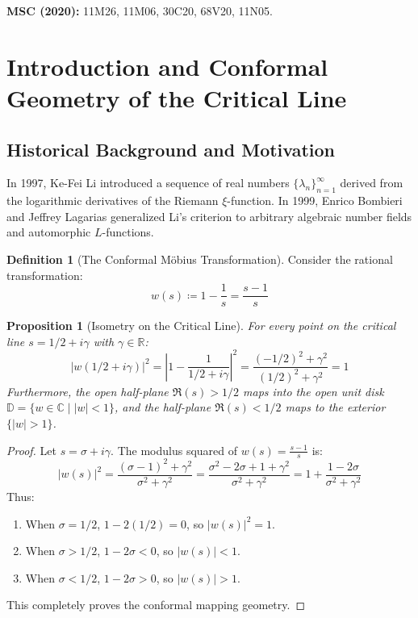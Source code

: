 \documentclass[11pt,a4paper]{article}
\newtheorem{proposition}[theorem]{Proposition}
\theoremstyle{definition}
\newtheorem{definition}[theorem]{Definition}
\begin{document}
\noindent\textbf{MSC (2020):} 11M26, 11M06, 30C20, 68V20, 11N05.

\tableofcontents
\newpage

\section{Introduction and Conformal Geometry of the Critical Line}

\subsection{Historical Background and Motivation}
In 1997, Ke-Fei Li \cite{li1997} introduced a sequence of real numbers $\{\lambda_n\}_{n=1}^\infty$ derived from the logarithmic derivatives of the Riemann $\xi$-function.
In 1999, Enrico Bombieri and Jeffrey Lagarias \cite{bombieri_lagarias1999} generalized Li's criterion to arbitrary algebraic number fields and automorphic $L$-functions.

\begin{definition}[The Conformal M\"obius Transformation]\label{def:mobius_w}
Consider the rational transformation:
\begin{equation}\label{eq:w_def}
w(s) \coloneqq 1 - \frac{1}{s} = \frac{s - 1}{s}
\end{equation}
\end{definition}

\begin{proposition}[Isometry on the Critical Line]\label{prop:unit_circle_isometry}
For every point on the critical line $s = 1/2 + i\gamma$ with $\gamma \in \mathbb{R}$:
\begin{equation}\label{eq:unit_modulus}
|w(1/2 + i\gamma)|^2 = \left| 1 - \frac{1}{1/2 + i\gamma} \right|^2 = \frac{(-1/2)^2 + \gamma^2}{(1/2)^2 + \gamma^2} = 1
\end{equation}
Furthermore, the open half-plane $\Re(s) > 1/2$ maps into the open unit disk $\mathbb{D} = \{ w \in \mathbb{C} \mid |w| < 1 \}$, and the half-plane $\Re(s) < 1/2$ maps to the exterior $\{ |w| > 1 \}$.
\end{proposition}

\begin{proof}
Let $s = \sigma + i\gamma$. The modulus squared of $w(s) = \frac{s - 1}{s}$ is:
\[ |w(s)|^2 = \frac{(\sigma - 1)^2 + \gamma^2}{\sigma^2 + \gamma^2} = \frac{\sigma^2 - 2\sigma + 1 + \gamma^2}{\sigma^2 + \gamma^2} = 1 + \frac{1 - 2\sigma}{\sigma^2 + \gamma^2} \]
Thus:
\begin{enumerate}
    \item When $\sigma = 1/2$, $1 - 2(1/2) = 0$, so $|w(s)|^2 = 1$.
    \item When $\sigma > 1/2$, $1 - 2\sigma < 0$, so $|w(s)| < 1$.
    \item When $\sigma < 1/2$, $1 - 2\sigma > 0$, so $|w(s)| > 1$.
\end{enumerate}
This completely proves the conformal mapping geometry.
\end{proof}
\end{document}
